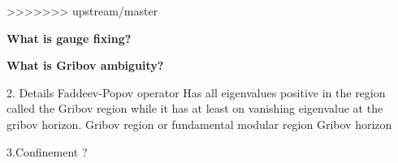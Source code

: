\begin{description}
>>>>>>> upstream/master








\textbf{What is gauge fixing?}



\textbf{What is Gribov ambiguity?}

2. Details
Faddeev-Popov operator
Has all eigenvalues positive in the region called the Gribov region while it has at least on vanishing eigenvalue at the gribov horizon.
Gribov region or fundamental modular region
Gribov horizon

3.Confinement ?


\end{description}
\renewcommand{\ssp}{a}
